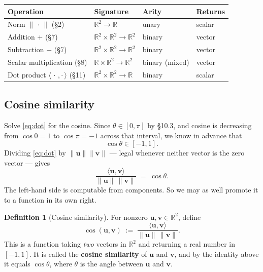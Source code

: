 \documentclass[11pt]{article}
\theoremstyle{definition}
\newtheorem{defn}{Definition}[section]
\theoremstyle{remark}
\newcommand{\R}{\mathbb{R}}
\newcommand{\vc}[1]{\mathbf{#1}}
\newcommand{\norm}[1]{\lVert #1\rVert}
\begin{document}
\begin{center}
\renewcommand{\arraystretch}{1.3}
\begin{tabular}{@{}l l l l@{}}
\toprule
\textbf{Operation} & \textbf{Signature} & \textbf{Arity} & \textbf{Returns} \\
\midrule
Norm $\norm{\,\cdot\,}$ (\S2)                & $\R^{2}\to\R$                    & unary            & scalar \\
Addition $+$ (\S7)                           & $\R^{2}\times\R^{2}\to\R^{2}$    & binary           & vector \\
Subtraction $-$ (\S7)                        & $\R^{2}\times\R^{2}\to\R^{2}$    & binary           & vector \\
Scalar multiplication (\S8)                  & $\R\times\R^{2}\to\R^{2}$        & binary (mixed)   & vector \\
Dot product $\langle\,\cdot\,,\cdot\,\rangle$ (\S11) & $\R^{2}\times\R^{2}\to\R$ & binary          & scalar \\
\bottomrule
\end{tabular}
\end{center}

\subsection{Cosine similarity}
Solve \eqref{eq:dot} for the cosine. Since $\theta\in[0,\pi]$ by \S10.3, and
cosine is decreasing from $\cos 0=1$ to $\cos\pi=-1$ across that interval, we
know in advance that
\[
  \cos\theta\in[-1,1].
\]
Dividing \eqref{eq:dot} by $\norm{\vc{u}}\norm{\vc{v}}$ --- legal whenever
neither vector is the zero vector --- gives
\[
  \frac{\langle \vc{u},\vc{v}\rangle}{\norm{\vc{u}}\,\norm{\vc{v}}}
  \;=\; \cos\theta .
\]
The left-hand side is computable from components. So we may as well promote it
to a function in its own right.

\begin{defn}[Cosine similarity]
For nonzero $\vc{u},\vc{v}\in\R^{2}$, define
\[
  \cos(\vc{u},\vc{v})
  \;:=\;
  \frac{\langle \vc{u},\vc{v}\rangle}{\norm{\vc{u}}\,\norm{\vc{v}}} .
\]
This is a function taking \emph{two} vectors in $\R^{2}$ and returning a real
number in $[-1,1]$. It is called the \textbf{cosine similarity} of $\vc{u}$ and
$\vc{v}$, and by the identity above it equals $\cos\theta$, where $\theta$ is
the angle between $\vc{u}$ and $\vc{v}$.
\end{defn}
\end{document}
